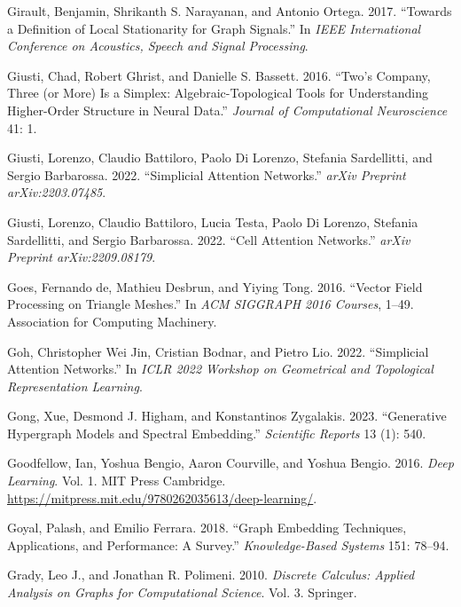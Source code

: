 \documentclass[
  12pt,
]{krantz}
\newlength{\cslhangindent}
\newenvironment{CSLReferences}[2] %
 {\begin{list}{}{%
  \setlength{\itemindent}{0pt}
  \setlength{\leftmargin}{0pt}
  \setlength{\parsep}{0pt}
  \ifodd #1
   \setlength{\leftmargin}{\cslhangindent}
   \setlength{\itemindent}{-1\cslhangindent}
  \fi
  \setlength{\itemsep}{#2\baselineskip}}}
 {\end{list}}
\begin{document}
\begin{CSLReferences}{1}{0}
Girault, Benjamin, Shrikanth S. Narayanan, and Antonio Ortega. 2017.
{``Towards a Definition of Local Stationarity for Graph Signals.''} In
\emph{IEEE International Conference on Acoustics, Speech and Signal
Processing}.

Giusti, Chad, Robert Ghrist, and Danielle S. Bassett. 2016. {``Two's
Company, Three (or More) Is a Simplex: Algebraic-Topological Tools for
Understanding Higher-Order Structure in Neural Data.''} \emph{Journal of
Computational Neuroscience} 41: 1.

Giusti, Lorenzo, Claudio Battiloro, Paolo Di Lorenzo, Stefania
Sardellitti, and Sergio Barbarossa. 2022. {``Simplicial Attention
Networks.''} \emph{arXiv Preprint arXiv:2203.07485}.

Giusti, Lorenzo, Claudio Battiloro, Lucia Testa, Paolo Di Lorenzo,
Stefania Sardellitti, and Sergio Barbarossa. 2022. {``Cell Attention
Networks.''} \emph{arXiv Preprint arXiv:2209.08179}.

Goes, Fernando de, Mathieu Desbrun, and Yiying Tong. 2016. {``Vector
Field Processing on Triangle Meshes.''} In \emph{ACM SIGGRAPH 2016
Courses}, 1--49. Association for Computing Machinery.

Goh, Christopher Wei Jin, Cristian Bodnar, and Pietro Lio. 2022.
{``Simplicial Attention Networks.''} In \emph{ICLR 2022 Workshop on
Geometrical and Topological Representation Learning}.

Gong, Xue, Desmond J. Higham, and Konstantinos Zygalakis. 2023.
{``Generative Hypergraph Models and Spectral Embedding.''}
\emph{Scientific Reports} 13 (1): 540.

Goodfellow, Ian, Yoshua Bengio, Aaron Courville, and Yoshua Bengio.
2016. \emph{Deep Learning}. Vol. 1. MIT Press Cambridge.
\url{https://mitpress.mit.edu/9780262035613/deep-learning/}.

Goyal, Palash, and Emilio Ferrara. 2018. {``Graph Embedding Techniques,
Applications, and Performance: A Survey.''} \emph{Knowledge-Based
Systems} 151: 78--94.

Grady, Leo J., and Jonathan R. Polimeni. 2010. \emph{Discrete Calculus:
Applied Analysis on Graphs for Computational Science}. Vol. 3. Springer.


\end{CSLReferences}
\end{document}
